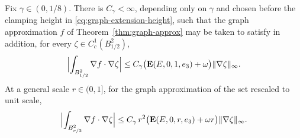 \begin{lemma}\label{lem:approx-harmonic}
Fix $\gamma\in(0,1/8)$.  There is $C_\gamma<\infty$, depending only on
$\gamma$ and chosen before the clamping height in
\eqref{eq:graph-extension-height}, such that the graph approximation $f$ of
Theorem~\ref{thm:graph-approx} may be taken to satisfy in addition, for every
$\zeta\in C^1_c(B^2_{1/2})$,
\begin{equation}\label{eq:approx-harmonic-clean}
  \Bigl|\int_{B^2_{1/2}}\nabla f\cdot\nabla\zeta\Bigr|
  \le C_\gamma\bigl(\operatorname{\mathbf E}(E,0,1,e_3)+\omega\bigr)\|\nabla\zeta\|_\infty .
\end{equation}
At a general scale $r\in(0,1]$, for the graph approximation of the set
rescaled to unit scale,
\begin{equation}\label{eq:approx-harmonic-scaled}
  \Bigl|\int_{B^2_{r/2}}\nabla f\cdot\nabla\zeta\Bigr|
  \le C_\gamma\,r^2\bigl(\operatorname{\mathbf E}(E,0,r,e_3)+\omega r\bigr)\|\nabla\zeta\|_\infty .
\end{equation}
\end{lemma}

